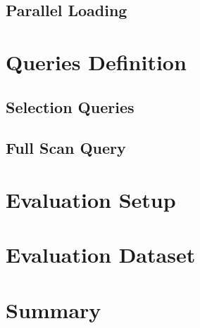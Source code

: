 {\subsection{Parallel Loading}


\section{Queries Definition}
\label{qryDef}
\subsection{Selection Queries}
\subsection{Full Scan Query}


\section{Evaluation Setup}
\label{evalEnv}


\section{Evaluation Dataset}
\label{dataset}


\section{Summary}
\label{Eval:summary}

}